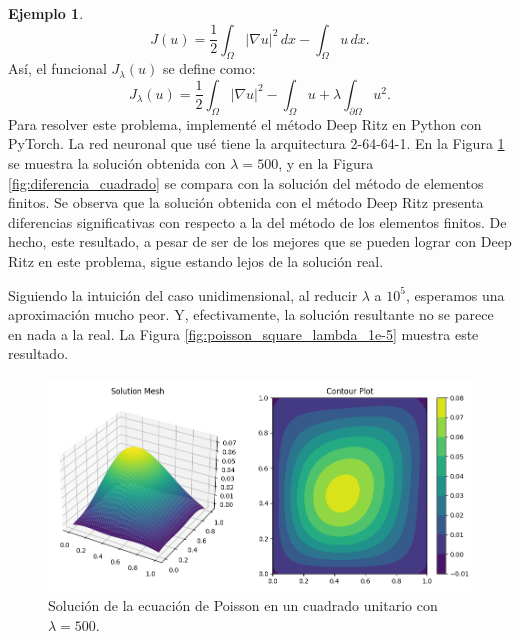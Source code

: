 \documentclass[a4paper,11pt,spanish, twoside, leqno]{tfg-uam}
\theoremstyle{definition}
\newtheorem{exmp}[teor]{Ejemplo}
\begin{document}
\begin{mdframed}
\begin{exmp}
\begin{equation*}
        J(u) = \frac{1}{2} \int_{\Omega} |\nabla u|^2 \,dx - \int_{\Omega} u \,dx.
        \end{equation*}
        Así, el funcional $J_\lambda(u)$ se define como:
        \begin{equation*}
        J_\lambda(u) = \frac{1}{2} \int_\Omega |\nabla u|^2 - \int_\Omega u + \lambda \int_{\partial \Omega} u^2.
        \end{equation*}
        Para resolver este problema, implementé el método Deep Ritz en Python con PyTorch. La red neuronal que usé tiene la arquitectura 2-64-64-1. En la Figura \ref{fig:poisson_square} se muestra la solución obtenida con $\lambda=500$, y en la Figura \ref{fig:diferencia_cuadrado} se compara con la solución del método de elementos finitos. Se observa que la solución obtenida con el método Deep Ritz presenta diferencias significativas con respecto a la del método de los elementos finitos. De hecho, este resultado, a pesar de ser de los mejores que se pueden lograr con Deep Ritz en este problema, sigue estando lejos de la solución real.

        Siguiendo la intuición del caso unidimensional, al reducir $\lambda$ a $10^5$, esperamos una aproximación mucho peor. Y, efectivamente, la solución resultante no se parece en nada a la real. La Figura \ref{fig:poisson_square_lambda_1e-5} muestra este resultado.

        \begin{figure}[H]
            \centering
            \includegraphics[width=1\textwidth]{Figuras/PoissonSquareBien.png}
            \caption{Solución de la ecuación de Poisson en un cuadrado unitario con $\lambda = 500$.}
            \label{fig:poisson_square}
        \end{figure}


\end{exmp}
\end{mdframed}
\end{document}
